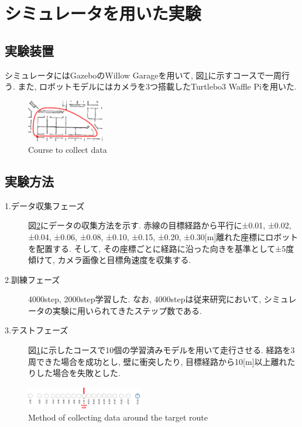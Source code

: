 \documentclass[10pt]{ujarticle}
\begin{document}
    \section{シミュレータを用いた実験}%
    \subsection{実験装置}シミュレータにはGazeboのWillow Garage\cite{willow}を用いて, 図\ref{Fig:willow}に示すコースで一周行う. また, ロボットモデルにはカメラを3つ搭載したTurtlebo3 Waffle Piを用いた. 

    \begin{figure}[h]
        \centering
        \includegraphics[width=0.3\textwidth]{fig/willow-path.png}
        \caption{Course to collect data}
        \label{Fig:willow}
    \end{figure}

    \subsection{実験方法}
    \begin{description}
        \item[1.データ収集フェーズ]図\ref{Fig:collect-data}にデータの収集方法を示す. 赤線の目標経路から平行に±0.01, ±0.02, ±0.04, ±0.06, ±0.08, ±0.10, ±0.15, ±0.20, ±0.30[m]離れた座標にロボットを配置する. そして, その座標ごとに経路に沿った向きを基準として±5度傾けて, カメラ画像と目標角速度を収集する. 
        \item[2.訓練フェーズ]4000step, 2000step学習した. なお, 4000stepは従来研究において, シミュレータの実験に用いられてきたステップ数である. 
        \item[3.テストフェーズ]図\ref{Fig:willow}に示したコースで10個の学習済みモデルを用いて走行させる. 経路を3周できた場合を成功とし, 壁に衝突したり, 目標経路から10[m]以上離れたりした場合を失敗とした. 
    \end{description}

    \begin{figure}[h]
        \centering
        \includegraphics[width=0.45\textwidth]{fig/collect-data.png}
        \caption{Method of collecting data around the target route}
        \label{Fig:collect-data}
    \end{figure}
\end{document}
